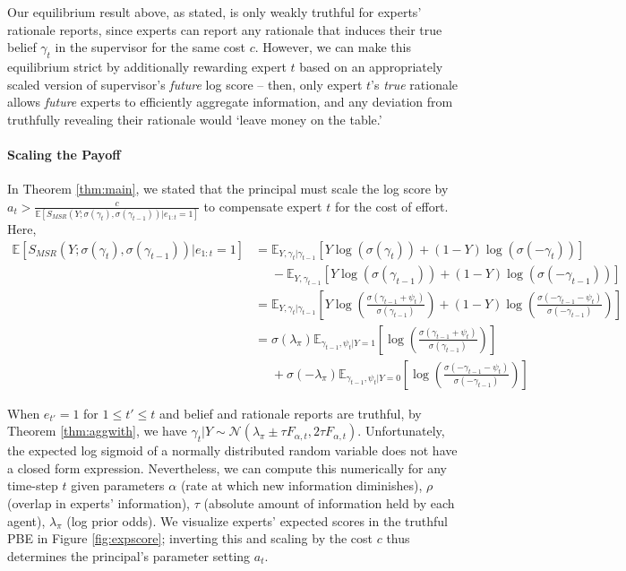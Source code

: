 \documentclass{winnower}
\begin{document}
Our equilibrium result above, as stated, is only weakly truthful for experts' rationale reports, since experts can report any rationale that induces their true belief $\gamma_t$ in the supervisor for the same cost $c$. However, we can make this equilibrium strict by additionally rewarding expert $t$ based on an appropriately scaled version of supervisor's \emph{future} log score -- then, only expert $t$'s \emph{true} rationale allows \emph{future} experts to efficiently aggregate information, and any deviation from truthfully revealing their rationale would `leave money on the table.'

\paragraph{Scaling the Payoff}
In Theorem \ref{thm:main}, we stated that the principal must scale the log score by $a_t > \frac{c}{\mathbb{E}[S_{MSR}(Y; \sigma(\gamma_t), \sigma(\gamma_{t-1}))|e_{1:t}=1]}$ to compensate expert $t$ for the cost of effort. Here,
{\small
\begin{equation}
\begin{split}
    \mathbb{E}[S_{MSR}(Y; \sigma(\gamma_t), \sigma(\gamma_{t-1}))|e_{1:t}=1] &= \mathbb{E}_{Y, \gamma_t|\gamma_{t-1}}\left[Y\log\left(\sigma\left(\gamma_t\right)\right) + (1-Y)\log\left(\sigma\left(-\gamma_t\right) \right)\right] \\
    &\phantom{=} - \mathbb{E}_{Y, \gamma_{t-1}}\left[Y\log\left(\sigma\left(\gamma_{t-1}\right)\right) + (1-Y)\log\left(\sigma\left(-\gamma_{t-1}\right)\right) \right] \\
    &= \mathbb{E}_{Y, \gamma_t|\gamma_{t-1}}\left[Y\log\left( \frac{\sigma\left(\gamma_{t-1} + \psi_t\right)}{\sigma\left(\gamma_{t-1}\right)}\right) + (1-Y)\log\left( \frac{\sigma\left(-\gamma_{t-1} - \psi_t\right)}{\sigma\left(-\gamma_{t-1}\right)}\right)\right] \\
    &= \sigma(\lambda_\pi)\mathbb{E}_{\gamma_{t-1}, \psi_t | Y=1}\left[\log\left( \frac{\sigma\left(\gamma_{t-1} + \psi_t\right)}{\sigma\left(\gamma_{t-1}\right)}\right)\right] \\
    &\phantom{=} + \sigma(-\lambda_\pi)\mathbb{E}_{\gamma_{t-1}, \psi_t | Y=0}\left[\log\left( \frac{\sigma\left(-\gamma_{t-1} - \psi_t\right)}{\sigma\left(-\gamma_{t-1}\right)}\right)\right]
    \end{split}
\end{equation}
}

When $e_{t'}=1$ for $1 \leq t' \leq t$ and belief and rationale reports are truthful, by Theorem \ref{thm:aggwith}, we have $\gamma_t|Y \sim \mathcal{N}\left(\lambda_\pi \pm \tau F_{\alpha,t}, 2\tau F_{\alpha,t}\right)$. Unfortunately, the expected log sigmoid of a normally distributed random variable does not have a closed form expression. Nevertheless, we can compute this numerically for any time-step $t$ given parameters $\alpha$ (rate at which new information diminishes), $\rho$ (overlap in experts' information), $\tau$ (absolute amount of information held by each agent), $\lambda_\pi$ (log prior odds). We visualize experts' expected scores in the truthful PBE in Figure \ref{fig:expscore}; inverting this and scaling by the cost $c$ thus determines the principal's parameter setting $a_t$.
\end{document}
